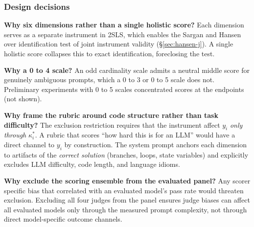 \documentclass{article}
\begin{document}
\subsubsection{Design decisions}
\textbf{Why six dimensions rather than a single holistic score?} Each dimension serves as a separate instrument in 2SLS, which enables the Sargan and Hansen over identification test of joint instrument validity (\S\ref{sec:hansen-j}). A single holistic score collapses this to exact identification, foreclosing the test.

\textbf{Why a 0 to 4 scale?} An odd cardinality scale admits a neutral middle score for genuinely ambiguous prompts, which a 0 to 3 or 0 to 5 scale does not. Preliminary experiments with 0 to 5 scales concentrated scores at the endpoints (not shown).

\textbf{Why frame the rubric around code structure rather than task difficulty?} The exclusion restriction requires that the instrument affect $y_i$ \emph{only through} $\kappa_i^*$. A rubric that scores ``how hard this is for an LLM'' would have a direct channel to $y_i$ by construction. The system prompt anchors each dimension to artifacts of the \emph{correct solution} (branches, loops, state variables) and explicitly excludes LLM difficulty, code length, and language idioms.

\textbf{Why exclude the scoring ensemble from the evaluated panel?} Any scorer specific bias that correlated with an evaluated model's pass rate would threaten exclusion. Excluding all four judges from the panel ensures judge biases can affect all evaluated models only through the measured prompt complexity, not through direct model-specific outcome channels.
\end{document}
